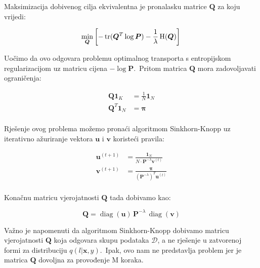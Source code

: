 \documentclass[diplomskirad]{fer}
\begin{document}
Maksimizacija dobivenog cilja ekvivalentna je pronalasku matrice $\bm{Q}$ za koju vrijedi:

\begin{equation}
    \min_{\bm{Q}} \left[-\operatorname{tr}(\bm{Q}^T \log \bm{P}) - \frac{1}{\lambda} \operatorname{H}(\bm{Q}) \right] \\ 
  \label{eq:vibe_e_reversed}
\end{equation}

Uočimo da ovo odgovara problemu optimalnog transporta s entropijskom regularizacijom uz matricu cijena $-\log \bm{P}$.\ Pritom matrica $\bm{Q}$ mora zadovoljavati ograničenja:

\begin{equation}
  \begin{aligned}
    \bm{Q} \bm{1}_K &= \frac{1}{N} \bm{1}_N \\
    \bm{Q}^T \bm{1}_N &= \bm{\pi} \\
  \end{aligned}
\label{eq:vibe_q_matrix_restrictions}
\end{equation}

\pagebreak

Rješenje ovog problema možemo pronaći algoritmom Sinkhorn-Knopp uz iterativno ažuriranje vektora $\bm{u}$ i $\bm{v}$ koristeći pravila:

\begin{equation}
  \begin{aligned}
    \bm{u}^{(t + 1)} &= \frac{\bm{1}_N}{N \cdot \bm{P}^{-\lambda} \bm{v}^{(t)}} \\
    \bm{v}^{(t + 1)} &= \frac{\bm{\pi}}{(\bm{P}^{-\lambda})^T \bm{u}^{(t)}} \\
  \end{aligned}
  \label{eq:vibe_sk_rules}
\end{equation}

Konačnu matricu vjerojatnosti $\bm{Q}$ tada dobivamo kao:

\begin{equation}
  \bm{Q} = \operatorname{diag}(\bm{u})\,\bm{P}^{-\lambda}\,\operatorname{diag}(\bm{v})
  \label{eq:vibe_q_formula}
\end{equation}

Važno je napomenuti da algoritmom Sinkhorn-Knopp dobivamo matricu vjerojatnosti $\bm{Q}$ koja odgovara skupu podataka $\mathcal{D}$, a ne rješenje u zatvorenoj formi za distribuciju $q(l | \bm{x}, y)$.\ 
Ipak, ovo nam ne predstavlja problem jer je matrica $\bm{Q}$ dovoljna za provođenje M koraka.\
\end{document}
